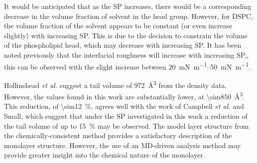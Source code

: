 It would be anticipated that as the SP increases, there would be a corresponding decrease in the volume fraction of solvent in the head group.\autocite{bayerl_specular_1990}
However, for DSPC, the volume fraction of the solvent appears to be constant (or even increase slightly) with increasing SP.
This is due to the decision to constrain the volume of the phospholipid head, which may decrease with increasing SP.
It has been noted previously that the interfacial roughness will increase with increasing SP,\autocite{lu_aspects_1994}, this can be observed with the slight increase between \SIrange{20}{50}{\milli\newton\per\meter}.

Hollinshead \emph{et al.}\autocite{hollinshead_effects_2009} suggest a tail volume of \SI{972}{\angstrom\cubed} from the density data.
However, the values found in this work are substantially lower, at \SI{\sim850}{\angstrom\cubed}.
This reduction, of \SI{\sim12}{\percent}, agrees well with the work of Campbell \emph{et al.}\autocite{campbell_structure_2018} and Small,\autocite{small_lateral_1984} which suggest that under the SP investigated in this work a reduction of the tail volume of up to \SI{15}{\percent} may be observed.
The model layer structure from the chemically-consistent method provides a satisfactory description of the monolayer structure.
However, the use of an MD-driven analysis method may provide greater insight into the chemical nature of the monolayer.


